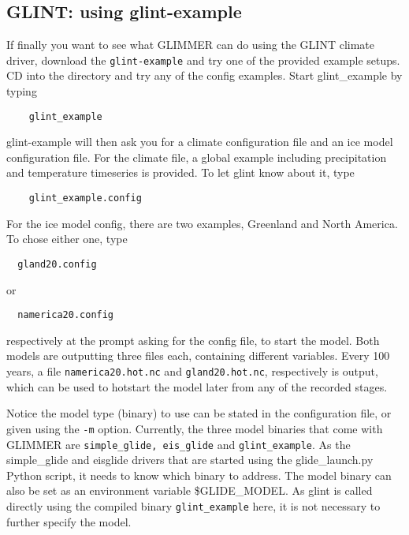 
\subsection{GLINT: using glint-example}
If finally you want to see what GLIMMER can do using the GLINT climate driver,
download the \texttt{glint-example} and try one of the provided example setups.
CD into the directory and try any of the config examples. Start glint_example
by typing
\begin{verbatim}
    glint_example
\end{verbatim}
glint-example will then ask you for a climate configuration file and an ice model 
configuration file.
For the climate file, a global example including precipitation and temperature timeseries
is provided. To let glint know about it, type
\begin{verbatim}
    glint_example.config
\end{verbatim}
For the ice model config, there are two examples, Greenland and North America. To chose either one, type
\begin{verbatim}
  gland20.config
\end{verbatim}
or
\begin{verbatim}
  namerica20.config
\end{verbatim}
respectively at the prompt asking for the config file, to start the model.
Both models are outputting three files each, containing different variables.
Every 100 years, a file \texttt{namerica20.hot.nc} and \texttt{gland20.hot.nc}, respectively is output, 
which can be used to hotstart the model later from any of the recorded stages.

Notice the model type (binary) to use can be stated in the configuration file,
or given using the \texttt{-m} option. Currently, the three model binaries that
come with GLIMMER are \texttt{simple\_glide, eis\_glide} and
\texttt{glint\_example}. As the simple\_glide and eis\-glide drivers that are started using the glide\_launch.py Python script,
 it needs to know which binary to address. The model binary can also be set as an environment variable \$GLIDE_MODEL. 
As glint is called directly using the compiled binary \texttt{glint\_example} here, it is not necessary to further 
specify the model.
